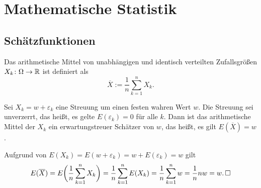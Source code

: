 \section{Mathematische Statistik}

\subsection{Schätzfunktionen}

\begin{Definition}\newlinefirst
Das arithmetische Mittel von unabhängigen und identisch verteilten
Zufallsgrößen $X_k\colon\Omega\to\mathbb R$ ist definiert als
\[\textstyle\overline X := \frac{1}{n}\sum_{k=1}^n X_k.\]
\end{Definition}

\begin{Satz}
Sei $X_k = w+\varepsilon_k$ eine Streuung um einen festen wahren Wert
$w$. Die Streuung sei unverzerrt, das heißt, es gelte
$E(\varepsilon_k)=0$ für alle $k$. Dann ist das arithmetische Mittel
der $X_k$ ein erwartungstreuer Schätzer von $w$, das heißt, es gilt
$E(\overline X)=w$.
\end{Satz}
\begin{Beweis} Aufgrund von
$E(X_k) = E(w+\varepsilon_k) = w+E(\varepsilon_k) = w$ gilt
\[E(\overline X) = E\bigg(\frac{1}{n}\sum_{k=1}^n X_k\bigg)
= \frac{1}{n}\sum_{k=1}^n E(X_k) = \frac{1}{n}\sum_{k=1}^n w
= \frac{1}{n}nw = w.\,\square\]
\end{Beweis}
